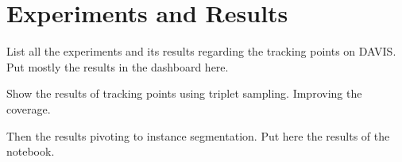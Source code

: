 
%
\newpage
\chapter{Experiments and Results}


List all the experiments and its results regarding the tracking points on DAVIS\@.
Put mostly the results in the dashboard here.

Show the results of tracking points using triplet sampling. Improving the coverage.

Then the results pivoting to instance segmentation. Put here the results of the notebook.

